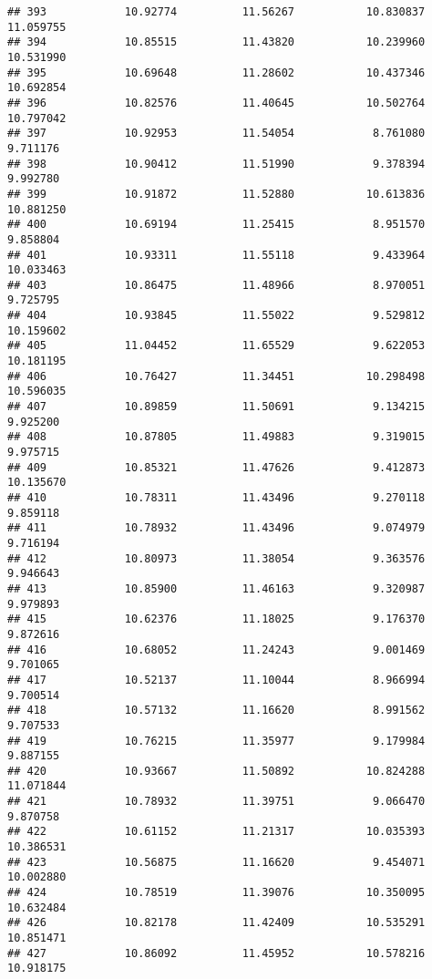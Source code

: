 \documentclass[
]{article}
\begin{document}
\begin{verbatim}
## 393            10.92774          11.56267           10.830837         11.059755
## 394            10.85515          11.43820           10.239960         10.531990
## 395            10.69648          11.28602           10.437346         10.692854
## 396            10.82576          11.40645           10.502764         10.797042
## 397            10.92953          11.54054            8.761080          9.711176
## 398            10.90412          11.51990            9.378394          9.992780
## 399            10.91872          11.52880           10.613836         10.881250
## 400            10.69194          11.25415            8.951570          9.858804
## 401            10.93311          11.55118            9.433964         10.033463
## 403            10.86475          11.48966            8.970051          9.725795
## 404            10.93845          11.55022            9.529812         10.159602
## 405            11.04452          11.65529            9.622053         10.181195
## 406            10.76427          11.34451           10.298498         10.596035
## 407            10.89859          11.50691            9.134215          9.925200
## 408            10.87805          11.49883            9.319015          9.975715
## 409            10.85321          11.47626            9.412873         10.135670
## 410            10.78311          11.43496            9.270118          9.859118
## 411            10.78932          11.43496            9.074979          9.716194
## 412            10.80973          11.38054            9.363576          9.946643
## 413            10.85900          11.46163            9.320987          9.979893
## 415            10.62376          11.18025            9.176370          9.872616
## 416            10.68052          11.24243            9.001469          9.701065
## 417            10.52137          11.10044            8.966994          9.700514
## 418            10.57132          11.16620            8.991562          9.707533
## 419            10.76215          11.35977            9.179984          9.887155
## 420            10.93667          11.50892           10.824288         11.071844
## 421            10.78932          11.39751            9.066470          9.870758
## 422            10.61152          11.21317           10.035393         10.386531
## 423            10.56875          11.16620            9.454071         10.002880
## 424            10.78519          11.39076           10.350095         10.632484
## 426            10.82178          11.42409           10.535291         10.851471
## 427            10.86092          11.45952           10.578216         10.918175

\end{verbatim}
\end{document}

